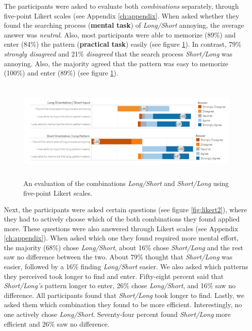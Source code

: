 The participants were asked to evaluate both \textit{combinations} separately, through five-point Likert scales (see Appendix \ref{ch:appendix}. When asked whether they found the searching process (\textbf{mental task}) of \textit{Long/Short} annoying, the average answer was \textit{neutral}. Also, most participants were able to memorize (89\%) and enter (84\%) the pattern (\textbf{practical task}) easily (see figure \ref{fig:likert}). In contrast, 79\% \textit{strongly disagreed} and 21\% \textit{disagreed} that the search process \textit{Short/Long} was annoying. Also, the majority agreed that the pattern was easy to memorize (100\%) and enter (89\%) (see figure \ref{fig:likert}).
 
 \begin{figure}[t!]
\centering
\includegraphics[width=15cm, height=5cm]{Chapters/graphics/Likert1213.PNG}
\caption{An evaluation of the combinations \textit{Long/Short} and \textit{Short/Long} using five-point Likert scales. }
\label{fig:likert}
\end{figure}

Next, the participants were asked certain questions (see figure \ref{fig:likert2}), where they had to actively choose which of the both combinations they found applied more. These questions were also answered through Likert scales (see Appendix \ref{ch:appendix}). When asked which one they found required more mental effort, the majority (68\%) chose \textit{Long/Short}, about 16\% chose \textit{Short/Long} and the rest saw no difference between the two. 
About 79\% thought that \textit{Short/Long} was easier, followed by a 16\% finding \textit{Long/Short} easier. We also asked which patterns they perceived took longer to find and enter. Fifty-eight percent said that \textit{Short/Long's} pattern longer to enter, 26\% chose \textit{Long/Short}, and 16\% saw no difference. All participants found that \textit{Short/Long} took longer to find. Lastly, we asked them which combination they found to be more efficient. Interestingly, no one actively chose \textit{Long/Short}. Seventy-four percent found \textit{Short/Long} more efficient and 26\% saw no difference. \\


